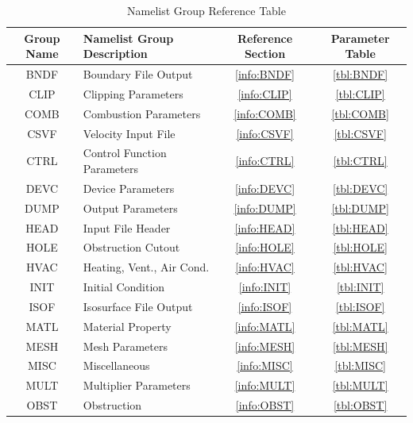 \documentclass[11pt]{book}
\begin{document}
\vspace{\baselineskip}
\begin{table}[ht]
\begin{center}
\caption{Namelist Group Reference Table}
\label{tbl:namelistgroups}
\begin{tabular}{|c|l|c|c|}
\hline
Group Name  & Namelist Group Description& Reference Section & Parameter Table  \\ \hline
{\ct BNDF}  & Boundary File Output         & \ref{info:BNDF} & \ref{tbl:BNDF}  \\ \hline
{\ct CLIP}  & Clipping Parameters          & \ref{info:CLIP} & \ref{tbl:CLIP}  \\ \hline
{\ct COMB}  & Combustion Parameters        & \ref{info:COMB} & \ref{tbl:COMB}  \\ \hline
{\ct CSVF}  & Velocity Input File          & \ref{info:CSVF} & \ref{tbl:CSVF}  \\ \hline
{\ct CTRL}  & Control Function Parameters  & \ref{info:CTRL} & \ref{tbl:CTRL}  \\ \hline
{\ct DEVC}  & Device Parameters            & \ref{info:DEVC} & \ref{tbl:DEVC}  \\ \hline
{\ct DUMP}  & Output Parameters            & \ref{info:DUMP} & \ref{tbl:DUMP}  \\ \hline
{\ct HEAD}  & Input File Header            & \ref{info:HEAD} & \ref{tbl:HEAD}  \\ \hline
{\ct HOLE}  & Obstruction Cutout           & \ref{info:HOLE} & \ref{tbl:HOLE}  \\ \hline
{\ct HVAC}  & Heating, Vent., Air Cond.    & \ref{info:HVAC} & \ref{tbl:HVAC}  \\ \hline
{\ct INIT}  & Initial Condition            & \ref{info:INIT} & \ref{tbl:INIT}  \\ \hline
{\ct ISOF}  & Isosurface File Output       & \ref{info:ISOF} & \ref{tbl:ISOF}  \\ \hline
{\ct MATL}  & Material Property            & \ref{info:MATL} & \ref{tbl:MATL}  \\ \hline
{\ct MESH}  & Mesh Parameters              & \ref{info:MESH} & \ref{tbl:MESH}  \\ \hline
{\ct MISC}  & Miscellaneous                & \ref{info:MISC} & \ref{tbl:MISC}  \\ \hline
{\ct MULT}  & Multiplier Parameters        & \ref{info:MULT} & \ref{tbl:MULT}  \\ \hline
{\ct OBST}  & Obstruction                  & \ref{info:OBST} & \ref{tbl:OBST}  \\ \hline

\end{tabular}
\end{center}
\end{table}
\end{document}
